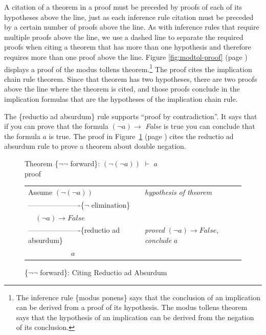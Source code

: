 {A citation of a theorem in a proof must be preceded by proofs of
each of its hypotheses above the line, just as
each inference rule citation must be preceded by a certain number of proofs above the line.
As with inference rules that require multiple proofs above the line,
we use a dashed line to separate the required proofs
when citing a theorem that has more than one hypothesis and therefore
requires more than one proof above the line.
Figure \ref{fig:modtol-proof} (page \pageref{fig:modtol-proof})
displays a proof of the modus tollens theorem.\footnote{The
inference rule \{modus ponens\} says that the conclusion of an implication
can be derived from a proof of its hypothesis.
The modus tollens theorem says that the hypothesis
of an implication can be derived from the negation of its conclusion.}
The proof cites the implication chain rule theorem.
Since that theorem has two hypotheses, there are two proofs above
the line where the theorem is cited, and those proofs conclude in
the implication formulas that are the hypotheses of the implication chain rule.

The \{reductio ad absurdum\} rule supports
``proof by contradiction''.
It says that if you can prove that the formula
$(\neg a) \rightarrow$ \emph{False} is true
you can conclude that the formula $a$ is true.
The proof in Figure~\ref{fig:dbl-neg-fwd} (page \pageref{fig:dbl-neg-fwd})
cites the
reductio
ad absurdum rule to prove a theorem about double negation.

\begin{figure}
Theorem \{$\neg \neg$ forward\}: $(\neg(\neg a))$ $\vdash$ $a$\\
proof
\begin{center}
\begin{tabular}{ll}
Assume $(\neg(\neg a))$                       &\emph{hypothesis of theorem}\\
----------------------\{$\neg$ elimination\}  &\\
~~$(\neg a) \rightarrow False$                &\\
----------------------\{reductio ad absurdum\}&\emph{proved} $(\neg a) \rightarrow False$, \emph{conclude} $a$\\
~~~~~~~~~~~~$a$                               &\\
\end{tabular}
\end{center}
\caption{\{$\neg \neg$ forward\}: Citing Reductio ad Absurdum}
\label{fig:dbl-neg-fwd}
\end{figure}

}
